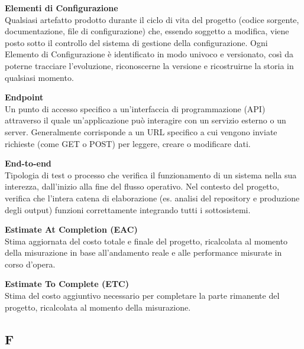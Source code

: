\documentclass[12pt, a4paper]{article}
\begin{document}
\noindent\hypertarget{elementi-configurazione}{\textbf{Elementi di Configurazione}} \\[0.1em]
Qualsiasi artefatto prodotto durante il ciclo di vita del progetto (codice sorgente, documentazione, file di configurazione) che, essendo soggetto a modifica, viene posto sotto il controllo del sistema di gestione della configurazione. Ogni Elemento di Configurazione è identificato in modo univoco e versionato, così da poterne tracciare l'evoluzione, riconoscerne la versione e ricostruirne la storia in qualsiasi momento.
\vspace{0.5cm}

\noindent\hypertarget{endpoint}{\textbf{Endpoint}} \\[0.1em]
Un punto di accesso specifico a un'interfaccia di programmazione (API) attraverso il quale un'applicazione può interagire con un servizio esterno o un server. Generalmente corrisponde a un URL specifico a cui vengono inviate richieste (come GET o POST) per leggere, creare o modificare dati.
\vspace{0.1cm}

\noindent\hypertarget{end-to-end}{\textbf{End-to-end}} \\[0.1em]
Tipologia di test o processo che verifica il funzionamento di un sistema nella sua interezza, dall'inizio alla fine del flusso operativo. Nel contesto del progetto, verifica che l'intera catena di elaborazione (es. analisi del repository e produzione degli output) funzioni correttamente integrando tutti i sottosistemi.
\vspace{0.5cm}

\noindent\hypertarget{estimate-at-completion}{\textbf{Estimate At Completion (EAC)}} \\[0.1em]
Stima aggiornata del costo totale e finale del progetto, ricalcolata al momento della misurazione in base all'andamento reale e alle performance misurate in corso d'opera.
\vspace{0.5cm}

\noindent\hypertarget{estimate-to-complete}{\textbf{Estimate To Complete (ETC)}} \\[0.1em]
Stima del costo aggiuntivo necessario per completare la parte rimanente del progetto, ricalcolata al momento della misurazione.
\vspace{0.5cm}
\newpage

\subsection*{F}
{}
\vspace{0.2cm}
\end{document}
